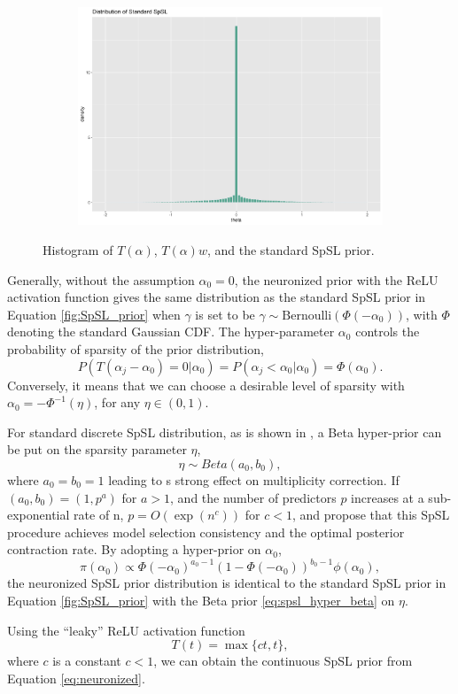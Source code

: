 \begin{figure}[t]
\begin{subfigure}[b]{0.49\textwidth}
         \includegraphics[width=\textwidth]{Figures/SpSLprior3.png}
     \end{subfigure}
        \caption{Histogram of $T(\alpha)$, $T(\alpha)w$, and the standard SpSL prior.}
        \label{fig:SpSL_prior}
\end{figure}

Generally, without the assumption $\alpha_0 = 0$, the neuronized prior with the ReLU activation function gives the same distribution as the standard SpSL prior in Equation \eqref{fig:SpSL_prior} when $\gamma$ is set to be $\gamma \sim \text{Bernoulli}(\Phi(-\alpha_0))$, with $\Phi$ denoting the standard Gaussian CDF. The hyper-parameter $\alpha_0$ controls the probability of sparsity of the prior distribution, 
$$P(T(\alpha_j - \alpha_0) = 0|\alpha_0) = P(\alpha_j < \alpha_0 | \alpha_0) = \Phi(\alpha_0).$$
Conversely, it means that we can choose a desirable level of sparsity with $\alpha_0 = -\Phi^{-1}(\eta)$, for any $\eta \in (0,1)$.

For standard discrete SpSL distribution, as is shown in \citet{scott2010bayes}, a Beta hyper-prior can be put on the sparsity parameter $\eta$,
\begin{equation} \label{eq:spsl_hyper_beta}
    \eta \sim Beta(a_0,b_0),
\end{equation}
where $a_0 = b_0 = 1$ leading to s strong effect on multiplicity correction. If $(a_0,b_0) = (1,p^a)$ for $a>1$, and the number of predictors $p$ increases at a sub-exponential rate of n, $p = O(\exp(n^c))$ for $c<1$, \citet{castillo2012needles} and \citet{castillo2015bayesian} propose that this SpSL procedure achieves model selection consistency and the optimal posterior contraction rate. By adopting a hyper-prior on $\alpha_0$, 
$$ \pi(\alpha_0) \propto \Phi(-\alpha_0)^{a_0-1} (1-\Phi(-\alpha_0))^{b_0 -1} \phi(\alpha_0),$$
the neuronized SpSL prior distribution is identical to the standard SpSL prior in Equation \eqref{fig:SpSL_prior} with the Beta prior \eqref{eq:spsl_hyper_beta} on $\eta$.

Using the ``leaky'' ReLU activation function
$$ T(t) = \max \{ct,t\},$$
where $c$ is a constant $c<1$, we can obtain the continuous SpSL prior from Equation \eqref{eq:neuronized}. 
